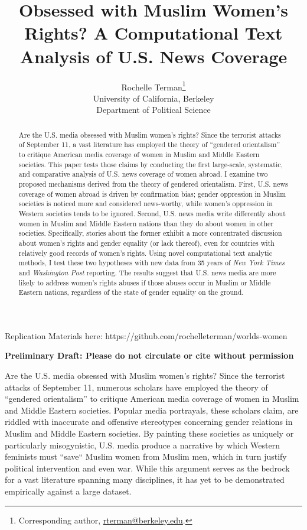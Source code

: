 \documentclass[11pt, oneside]{article}
\title{Obsessed with Muslim Women's Rights? A Computational Text Analysis of U.S. News Coverage}
\author{Rochelle Terman\thanks{Corresponding author, \url{rterman@berkeley.edu}. } \\University of California, Berkeley\\Department of Political Science}
\begin{document}
\baselineskip
\setcounter{page}{0}

\maketitle\thispagestyle{empty}

\begin{center}

Replication Materials here: https://github.com/rochelleterman/worlds-women

\textbf{Preliminary Draft: Please do not circulate or cite without permission} 
\end{center}

\vspace{1cm}

\begin{abstract}
\noindent Are the U.S. media obsessed with Muslim women's rights? Since the terrorist attacks of September 11, a vast literature has employed the theory of ``gendered orientalism'' to critique American media coverage of women in Muslim and Middle Eastern societies. This paper tests those claims by conducting the first large-scale, systematic, and comparative analysis of U.S. news coverage of women abroad. I examine two proposed mechanisms derived from the theory of gendered orientalism. First, U.S. news coverage of women abroad is driven by confirmation bias; gender oppression in Muslim societies is noticed more and considered news-worthy, while women's oppression in Western societies tends to be ignored. Second, U.S. news media write differently about women in Muslim and Middle Eastern nations than they do about women in other societies. Specifically, stories about the former exhibit a more concentrated discussion about women's rights and gender equality (or lack thereof), even for countries with relatively good records of women's rights. Using novel computational text analytic methods, I test these two hypotheses with new data from 35 years of \emph{New York Times} and \emph{Washington Post} reporting. The results suggest that U.S. news media are more likely to address women's rights abuses if those abuses occur in Muslim or Middle Eastern nations, regardless of the state of gender equality on the ground.
\end{abstract}

\newpage\doublespace

Are the U.S. media obsessed with Muslim women's rights? Since the terrorist attacks of September 11, numerous scholars have employed the theory of ``gendered orientalism'' to critique American media coverage of women in Muslim and Middle Eastern societies. Popular media portrayals, these scholars claim, are riddled with inaccurate and offensive stereotypes concerning gender relations in Muslim and Middle Eastern societies. By painting these societies as uniquely or particularly misogynistic, U.S. media produce a narrative by which Western feminists must ``save`` Muslim women from Muslim men, which in turn justify political intervention and even war. While this argument serves as the bedrock for a vast literature spanning many disciplines, it has yet to be demonstrated empirically against a large dataset. 
\end{document}

